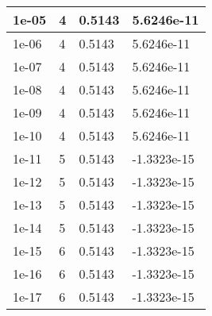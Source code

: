 \begin{tabular}{|l|l|l|l|}
\hline
1e-05&4&0.5143&5.6246e-11\\\hline
1e-06&4&0.5143&5.6246e-11\\\hline
1e-07&4&0.5143&5.6246e-11\\\hline
1e-08&4&0.5143&5.6246e-11\\\hline
1e-09&4&0.5143&5.6246e-11\\\hline
1e-10&4&0.5143&5.6246e-11\\\hline
1e-11&5&0.5143&-1.3323e-15\\\hline
1e-12&5&0.5143&-1.3323e-15\\\hline
1e-13&5&0.5143&-1.3323e-15\\\hline
1e-14&5&0.5143&-1.3323e-15\\\hline
1e-15&6&0.5143&-1.3323e-15\\\hline
1e-16&6&0.5143&-1.3323e-15\\\hline
1e-17&6&0.5143&-1.3323e-15\\\hline
\end{tabular}
